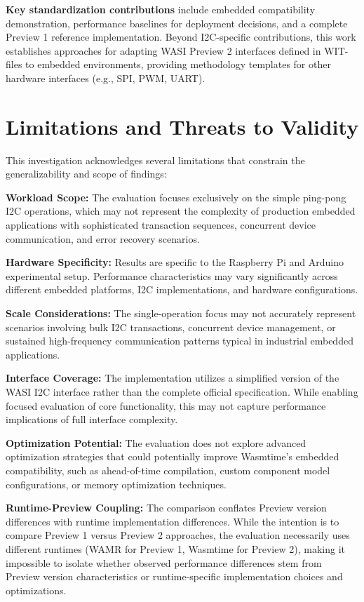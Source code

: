 \textbf{Key standardization contributions} include embedded compatibility demonstration, performance baselines for deployment decisions, and a complete Preview 1 reference implementation. Beyond I2C-specific contributions, this work establishes approaches for adapting WASI Preview 2 interfaces defined in WIT-files to embedded environments, providing methodology templates for other hardware interfaces (e.g., SPI, PWM, UART).

\section*{Limitations and Threats to Validity}
\label{sec:limitations}

This investigation acknowledges several limitations that constrain the generalizability and scope of findings:

\textbf{Workload Scope:} The evaluation focuses exclusively on the simple ping-pong I2C operations, which may not represent the complexity of production embedded applications with sophisticated transaction sequences, concurrent device communication, and error recovery scenarios.

\textbf{Hardware Specificity:} Results are specific to the Raspberry Pi and Arduino experimental setup. Performance characteristics may vary significantly across different embedded platforms, I2C implementations, and hardware configurations.

\textbf{Scale Considerations:} The single-operation focus may not accurately represent scenarios involving bulk I2C transactions, concurrent device management, or sustained high-frequency communication patterns typical in industrial embedded applications.

\textbf{Interface Coverage:} The implementation utilizes a simplified version of the WASI I2C interface rather than the complete official specification. While enabling focused evaluation of core functionality, this may not capture performance implications of full interface complexity.

\textbf{Optimization Potential:} The evaluation does not explore advanced optimization strategies that could potentially improve Wasmtime's embedded compatibility, such as ahead-of-time compilation, custom component model configurations, or memory optimization techniques.

\textbf{Runtime-Preview Coupling:} The comparison conflates Preview version differences with runtime implementation differences. While the intention is to compare Preview 1 versus Preview 2 approaches, the evaluation necessarily uses different runtimes (WAMR for Preview 1, Wasmtime for Preview 2), making it impossible to isolate whether observed performance differences stem from Preview version characteristics or runtime-specific implementation choices and optimizations.

